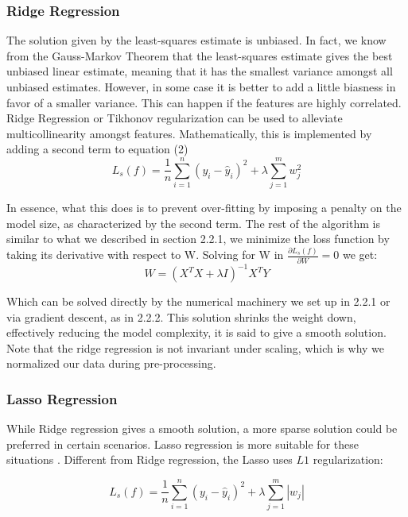\documentclass[conference,compsoc]{IEEEtran}
\begin{document}
\subsubsection{Ridge Regression}

The solution given by the least-squares estimate is unbiased. In fact, we know from the Gauss-Markov Theorem that the least-squares estimate gives the best unbiased linear estimate, meaning that it has the smallest variance amongst all unbiased estimates. However, in some case it is better to add a little biasness in favor of a smaller variance. This can happen if the features are highly correlated. Ridge Regression or Tikhonov regularization can be used to alleviate multicollinearity amongst features. Mathematically, this is implemented by adding a second term to equation (2)
\begin{equation}
L_{s}(f) = \frac{1}{n} \sum_{i=1}^n (y_{i} - \hat{y}_{i})^2 + \lambda \sum_{j=1}^m w_{j}^2
\end{equation}

In essence, what this does is to prevent over-fitting by imposing a penalty on the model size, as characterized by the second term. The rest of the algorithm is similar to what we described in section 2.2.1, we minimize the loss function by taking its derivative with respect to W. Solving for W in $\frac{\partial L_{s}(f)}{\partial W} = 0$ we get:
\begin{equation}
W = (X^TX+\lambda I)^{-1}X^TY
\end{equation}

Which can be solved directly by the numerical machinery we set up in 2.2.1 or via gradient descent, as in 2.2.2. This solution shrinks the weight down, effectively reducing the model complexity, it is said to give a smooth solution. Note that the ridge regression is not invariant under scaling, which is why we normalized our data during pre-processing.


\subsubsection{Lasso Regression} While Ridge regression gives a smooth solution, a more sparse solution could be preferred in certain scenarios. Lasso regression is more suitable for these situations \cite{tibshirani1996regression}. 
Different from Ridge regression, the Lasso uses $L1$ regularization:

\begin{equation}\label{eq:lasso}
L_{s}(f) = \frac{1}{n} \sum_{i=1}^n (y_{i} - \hat{y}_{i})^2 + \lambda \sum_{j=1}^m |w_{j}|
\end{equation}
\end{document}
